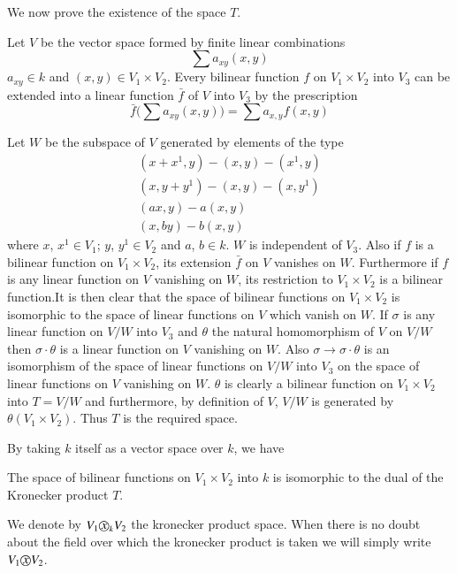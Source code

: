 We now prove the existence of the space $T$.

Let $V$ be the vector space formed by finite linear combinations
$$
\sum a_{xy}  (x, y)
$$
$a_{xy}\in  k$ and $(x, y)  \in  V_1 \times  V_2$. Every bilinear
function $f$ on $V_1 \times V_2$ into $V_3$ can be extended into a
linear function $\bar{f}$ of $V$ into $V_3$ by the prescription 
$$
\bar{f} \Big(\sum  a_{xy}  (x,y)\Big) = \sum a_{x,y}  f(x,y)
$$

Let $W$ be the subspace of $V$ generated by elements of the type 
\begin{gather*} 
(x + x^1,y) - (x,y) - (x^1, y)\\
(x, y + y^1) - (x,y) - (x,y^1)\\
(a  x,y) - a(x, y)\\
(x, b  y) - b(x, y)
\end{gather*}
where $x$, $x^1 \in V_1$; $y$, $y^1\in  V_2$ and $a$, $b \in
k$. $W$ is independent of $V_3$. Also if $f$ is a bilinear function on
$V_1 \times V_2$, its extension $\bar{f}$ on $V$ vanishes on
$W$. Furthermore if $f$ is any linear function on $V$ vanishing on
$W$, its restriction to $V_1 \times V_2$ is a bilinear
function.\pageoriginale It is 
then clear that the space  of bilinear functions on $V_1\times V_2$ is
isomorphic to the space of linear functions on $V$ which vanish on
$W$. If $\sigma$ is any linear function on $V/W$ into $V_3$ and
$\theta$ the natural homomorphism of $V$ on $V/W$ then $\sigma \cdot \theta
$ is a linear function on $V$ vanishing on $W$. Also $\sigma
\rightarrow \sigma \cdot \theta$ is an isomorphism of the space of linear
functions on $V/W$ into $V_3$ on the space of linear functions on $V$
vanishing on $W$. $\theta$ is clearly a bilinear function on $V_1\times
V_2$ into $T = V/W$ and furthermore, by definition of $V$, $V/W$ is
generated by $\theta (V_1 \times V_2)$. Thus $T$ is the required
space. 

By taking $k$ itself as a vector space over $k$, we have  

\begin{thm}\label{c5:thm2} %
The space of bilinear functions on $V_1\times V_2$ into $k$ is
  isomorphic to the dual of the Kronecker product $T$. 
\end{thm}

We denote by $V_1  \text{\textcircled{$x$}}_k  V_2$ the kronecker product
space. When there is no doubt about the field over which the kronecker
product is taken we will simply write $V_1 \text{\textcircled{$x$}} V_2$. 

